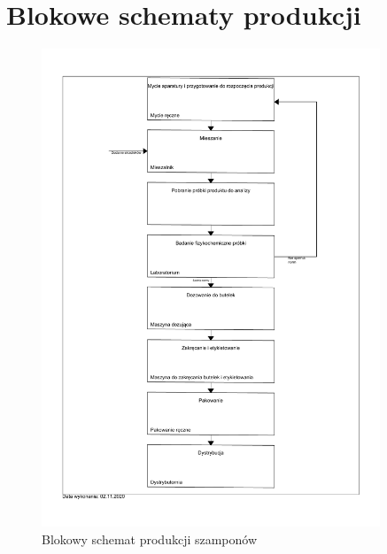\section{Blokowe schematy produkcji}

\begin{figure}[H]
	\centering
	\includegraphics[width=0.9\textwidth]{./sec5/szampony.pdf}
	\vspace{-3em}
	\caption{Blokowy schemat produkcji szamponów}
\end{figure}

